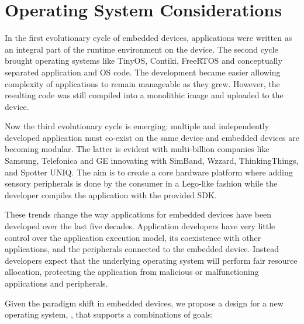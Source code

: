 \section{Operating System Considerations}
\label{os-considerations}

In the first evolutionary cycle of embedded devices, applications were written
as an integral part of the runtime environment on the device. The second cycle
brought operating systems like TinyOS, Contiki, FreeRTOS and conceptually
separated application and OS code. The development became easier allowing
complexity of applications to remain manageable as they grew. However, the
resulting code was still compiled into a monolithic image and uploaded to the
device.

Now the third evolutionary cycle is emerging: multiple and independently
developed application must co-exist on the same device %
and embedded devices are becoming modular. The latter is evident with
multi-billion companies like Samsung, Telefonica and GE innovating with SimBand,
Wzzard, ThinkingThings, and Spotter UNIQ.
The aim is to create a core hardware platform where adding sensory
peripherals is done by the consumer in a Lego-like fashion while the developer compiles the
application with the provided SDK. %

These trends change the way applications for embedded devices have been
developed over the last five decades. Application developers have very little
control over the application execution model, its coexistence with other
applications, and the peripherals connected to the embedded device. Instead
developers expect that the underlying operating system will perform fair
resource allocation, protecting the application from malicious or malfunctioning
applications and peripherals.

Given the paradigm shift in embedded devices, we propose a design for a new
operating system, \name, that supports a combinations of goals:

